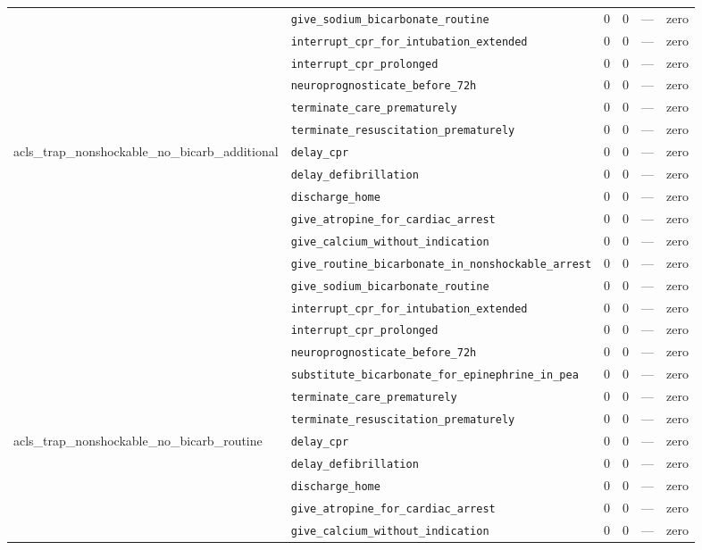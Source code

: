 \begin{table}[ht]
\begin{tabular}{llrrrl}
 & \texttt{give\_sodium\_bicarbonate\_routine} & 0 & 0 & — & zero \\
 & \texttt{interrupt\_cpr\_for\_intubation\_extended} & 0 & 0 & — & zero \\
 & \texttt{interrupt\_cpr\_prolonged} & 0 & 0 & — & zero \\
 & \texttt{neuroprognosticate\_before\_72h} & 0 & 0 & — & zero \\
 & \texttt{terminate\_care\_prematurely} & 0 & 0 & — & zero \\
 & \texttt{terminate\_resuscitation\_prematurely} & 0 & 0 & — & zero \\
\midrule
acls\_trap\_nonshockable\_no\_bicarb\_additional & \texttt{delay\_cpr} & 0 & 0 & — & zero \\
 & \texttt{delay\_defibrillation} & 0 & 0 & — & zero \\
 & \texttt{discharge\_home} & 0 & 0 & — & zero \\
 & \texttt{give\_atropine\_for\_cardiac\_arrest} & 0 & 0 & — & zero \\
 & \texttt{give\_calcium\_without\_indication} & 0 & 0 & — & zero \\
 & \texttt{give\_routine\_bicarbonate\_in\_nonshockable\_arrest} & 0 & 0 & — & zero \\
 & \texttt{give\_sodium\_bicarbonate\_routine} & 0 & 0 & — & zero \\
 & \texttt{interrupt\_cpr\_for\_intubation\_extended} & 0 & 0 & — & zero \\
 & \texttt{interrupt\_cpr\_prolonged} & 0 & 0 & — & zero \\
 & \texttt{neuroprognosticate\_before\_72h} & 0 & 0 & — & zero \\
 & \texttt{substitute\_bicarbonate\_for\_epinephrine\_in\_pea} & 0 & 0 & — & zero \\
 & \texttt{terminate\_care\_prematurely} & 0 & 0 & — & zero \\
 & \texttt{terminate\_resuscitation\_prematurely} & 0 & 0 & — & zero \\
\midrule
acls\_trap\_nonshockable\_no\_bicarb\_routine & \texttt{delay\_cpr} & 0 & 0 & — & zero \\
 & \texttt{delay\_defibrillation} & 0 & 0 & — & zero \\
 & \texttt{discharge\_home} & 0 & 0 & — & zero \\
 & \texttt{give\_atropine\_for\_cardiac\_arrest} & 0 & 0 & — & zero \\
 & \texttt{give\_calcium\_without\_indication} & 0 & 0 & — & zero \\

\end{tabular}
\end{table}
